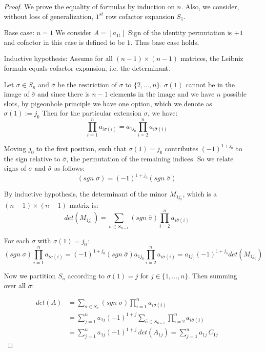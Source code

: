 \documentclass[10pt,a4paper]{amsart}
\begin{document}
\begin{proof}
    We prove the equality of formulas by induction on $n$. Also, we consider, without loss of generalization, $1^{st}$ row cofactor expansion $S_1$.
    
    Base case: $n = 1$
    We consider $A = [a_{11}]$
    Sign of the identity permutation is $+1$ and cofactor in this case is defined to be $1$. Thus base case holds.

    Inductive hypothesis:
    Assume for all $(n-1)\times(n-1)$ matrices, the Leibniz formula equals cofactor expansion, i.e. the determinant.

    Let $\sigma \in S_n$ and $\bar{\sigma}$ be the restriction of $\sigma$ to $\{2, ..., n\}$. $\sigma(1)$ cannot be in the image of $\bar{\sigma}$ and since there is $n-1$ elements in the image and we have $n$ possible slots, by pigeonhole principle we have one option, which we denote as $\sigma(1) := j_0$ 
    Then for the particular extension $\sigma$, we have:
    $$
    \prod_{i = 1}^na_{i\sigma(i)} = a_{1j_0}\prod_{i = 2}^n a_{i\bar{\sigma}(i)}
    $$

    Moving $j_0$ to the first position, such that $\sigma(1) = j_0$ contributes $(-1)^{1+j_0}$ to the sign relative to $\bar{\sigma}$, the permutation of the remaining indices. So we relate signs of $\sigma$ and $\bar{\sigma}$ as follows:
    $$(sgn\;\sigma) = (-1)^{1+j_0}(sgn\;\bar{\sigma})$$ 

    By inductive hypothesis, the determinant of the minor $M_{1j_0}$, which is a $(n - 1) \times (n - 1)$ matrix is:
    $$det(M_{1j_0}) = \sum_{\bar{\sigma} \in S_{n-1}}(sgn\;\bar{\sigma})\prod_{i = 2}^n a_{i \bar{\sigma}(i)}$$

    For each $\sigma$ with $\sigma(1) = j_0$:
    $$
    (sgn\;\sigma)\prod_{i=1}^n a_{i\sigma(i)} = (-1)^{1+j_0}(sgn\;\bar{\sigma}) a_{1j_0} \prod_{i = 2}^n a_{i \bar{\sigma}(i)} = a_{1j_0} (-1)^{1+j_0}det(M_{1j_0})
    $$

    Now we partition $S_n$ according to $\sigma(1) = j$ for $j \in \{1, ..., n\}$. Then summing over all $\sigma$:

    \begin{align*}
        det(A) &= \sum_{\sigma \in S_n}(sgn\;\sigma)\prod_{i = 1}^n a_{i\sigma(i)}\\
        &= \sum_{j = 1}^n a_{1j}(-1)^{1+j} \sum_{\bar{\sigma} \in S_{n-1}} \prod_{i = 2}^n a_{i\bar{\sigma}(i)}\\
        &= \sum_{j = 1}^n a_{1j}(-1)^{1+j}\,det(A_{1j}) = \sum_{j = 1}^n a_{1j}\,C_{1j} 
    \end{align*}
\end{proof}
\end{document}
